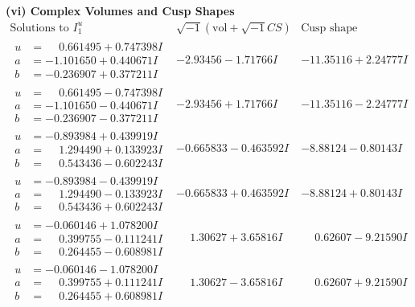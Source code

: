 \documentclass[1p]{elsarticle_modified}
\theoremstyle{definition}
\newcommand{\I}{\sqrt{-1}}
\begin{document}
\newpage\flushleft \textbf{(vi) Complex Volumes and Cusp Shapes}
$$\begin{array}{c|c|c}  
\text{Solutions to }I^u_{1}& \I (\text{vol} + \sqrt{-1}CS) & \text{Cusp shape}\\
 \hline 
\begin{aligned}
u &= \phantom{-}0.661495 + 0.747398 I \\
a &= -1.101650 + 0.440671 I \\
b &= -0.236907 + 0.377211 I\end{aligned}
 & -2.93456 - 1.71766 I & -11.35116 + 2.24777 I \\ \hline\begin{aligned}
u &= \phantom{-}0.661495 - 0.747398 I \\
a &= -1.101650 - 0.440671 I \\
b &= -0.236907 - 0.377211 I\end{aligned}
 & -2.93456 + 1.71766 I & -11.35116 - 2.24777 I \\ \hline\begin{aligned}
u &= -0.893984 + 0.439919 I \\
a &= \phantom{-}1.294490 + 0.133923 I \\
b &= \phantom{-}0.543436 - 0.602243 I\end{aligned}
 & -0.665833 - 0.463592 I & -8.88124 - 0.80143 I \\ \hline\begin{aligned}
u &= -0.893984 - 0.439919 I \\
a &= \phantom{-}1.294490 - 0.133923 I \\
b &= \phantom{-}0.543436 + 0.602243 I\end{aligned}
 & -0.665833 + 0.463592 I & -8.88124 + 0.80143 I \\ \hline\begin{aligned}
u &= -0.060146 + 1.078200 I \\
a &= \phantom{-}0.399755 - 0.111241 I \\
b &= \phantom{-}0.264455 - 0.608981 I\end{aligned}
 & \phantom{-}1.30627 + 3.65816 I & \phantom{-}0.62607 - 9.21590 I \\ \hline\begin{aligned}
u &= -0.060146 - 1.078200 I \\
a &= \phantom{-}0.399755 + 0.111241 I \\
b &= \phantom{-}0.264455 + 0.608981 I\end{aligned}
 & \phantom{-}1.30627 - 3.65816 I & \phantom{-}0.62607 + 9.21590 I \\ \hline\begin{aligned}

\end{aligned}
\end{array}$$
\end{document}
